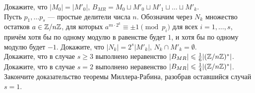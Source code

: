 \documentclass[a4paper,12pt]{article}
\begin{document}
 Докажите, что $|M_0|=|M'_0|$, $B_{MR} = M_0 \sqcup M'_0 \sqcup M'_1 \sqcup \ldots \sqcup M'_k$.\\
 Пусть $p_1,\ldots p_s$ --- простые делители числа $n$. Обозначим через $N_k$ множество остатков $a \in \mathbb{Z}/n\mathbb{Z}$, для которых $a^{m \cdot 2^k} \equiv \pm 1 \pmod{p_i}$ для всех $i=1,\ldots,s$, причём хотя бы по одному модулю в равенстве будет $1$, и хотя бы по одному модулю будет $-1$. Докажите, что $|N_k| = 2^s |M'_k|$, $N_k \cap M'_k =\emptyset$.\\
 Докажите, что в случае $s \geq 3$ выполнено неравенство $|B_{MR}| \leqslant \frac{1}{6}|(\mathbb{Z}/n\mathbb{Z})^*|$.\\
 Докажите, что в случае $s =2$ выполнено неравенство $|B_{MR}| \leqslant \frac{1}{4}|(\mathbb{Z}/n\mathbb{Z})^*|$.\\
 Закончите доказательство теоремы Миллера-Рабина, разобрав оставшийся случай $s=1$.


\end{document}
